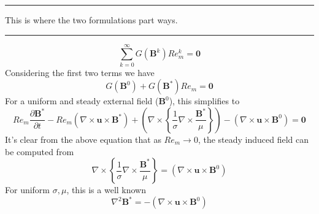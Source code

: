 \documentclass[11pt]{article}
\newcommand{\B}{\mathbf{B}}
\newcommand{\PD}{\partial}
\newcommand{\U}{\mathbf{u}}
\begin{document}
\noindent
\rule{\textwidth}{1pt}
\begin{center}
This is where the two formulations part ways.
\end{center}
\noindent
\rule{\textwidth}{1pt}
\begin{equation}
	\sum_{k=0}^{\infty} G(\B^k)
  Re_m^k
	=
	\mathbf{0}
\end{equation}
Considering the first two terms we have
\begin{equation}
  G(\B^0)
  +
  G(\B^{*}) Re_m
  =
  \mathbf{0}
\end{equation}
For a uniform and steady external field ($\B^0$), this simplifies to
\begin{equation}
  Re_m \frac{\PD \B^{*}}{\PD t} 
  -
  Re_m (\nabla \times \U \times \B^{*})
  +
  \left(
  \nabla \times
  \left\{
  \frac{1}{\sigma}
  \nabla \times
  \frac{\B^{*}}{\mu}
  \right\}
  \right)
  -
  (\nabla \times \U \times \B^0)
  =
  \mathbf{0}
\end{equation}
It's clear from the above equation that as $Re_m \rightarrow 0$, the steady induced field can be computed from
\begin{equation}
  \nabla \times
  \left\{
  \frac{1}{\sigma}
  \nabla \times
  \frac{\B^{*}}{\mu}
  \right\}
  =
  (\nabla \times \U \times \B^0)
\end{equation}
For uniform $\sigma, \mu$, this is a well known
\begin{equation}
  \nabla^2 \B^{*}
  =
  -
  (\nabla \times \U \times \B^0)
\end{equation}
\end{document}
